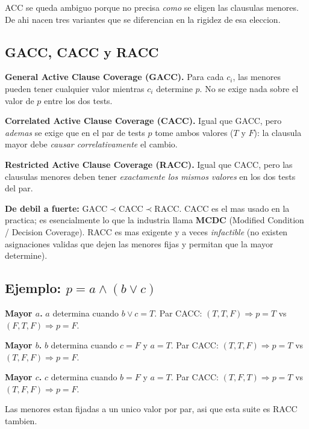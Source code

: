 \documentclass[12pt,a4paper]{article}
\begin{document}
ACC se queda ambiguo porque no precisa \emph{como} se eligen las clausulas menores. De ahi
nacen tres variantes que se diferencian en la rigidez de esa eleccion.

\subsection{GACC, CACC y RACC}

\begin{definicionbox}
\textbf{General Active Clause Coverage (GACC).} Para cada $c_i$, las menores pueden tener
cualquier valor mientras $c_i$ determine $p$. No se exige nada sobre el valor de $p$ entre los
dos tests.

\textbf{Correlated Active Clause Coverage (CACC).} Igual que GACC, pero \emph{ademas} se exige
que en el par de tests $p$ tome ambos valores ($T$ y $F$): la clausula mayor debe \emph{causar
correlativamente} el cambio.

\textbf{Restricted Active Clause Coverage (RACC).} Igual que CACC, pero las clausulas menores
deben tener \emph{exactamente los mismos valores} en los dos tests del par.
\end{definicionbox}

\begin{ideabox}
\textbf{De debil a fuerte:} $\text{GACC} \prec \text{CACC} \prec \text{RACC}$. CACC es el mas
usado en la practica; es esencialmente lo que la industria llama \textbf{MCDC} (Modified
Condition / Decision Coverage). RACC es mas exigente y a veces \emph{infactible} (no existen
asignaciones validas que dejen las menores fijas y permitan que la mayor determine).
\end{ideabox}

\subsection{Ejemplo: \texorpdfstring{$p = a \wedge (b \vee c)$}{p = a and (b or c)}}

\begin{ejemplobox}
\textbf{Mayor $a$.} $a$ determina cuando $b \vee c = T$. Par CACC:
$(T,T,F) \Rightarrow p=T$ vs $(F,T,F) \Rightarrow p=F$.

\textbf{Mayor $b$.} $b$ determina cuando $c=F$ y $a=T$. Par CACC:
$(T,T,F) \Rightarrow p=T$ vs $(T,F,F) \Rightarrow p=F$.

\textbf{Mayor $c$.} $c$ determina cuando $b=F$ y $a=T$. Par CACC:
$(T,F,T) \Rightarrow p=T$ vs $(T,F,F) \Rightarrow p=F$.

Las menores estan fijadas a un unico valor por par, asi que esta suite es RACC tambien.
\end{ejemplobox}
\end{document}

